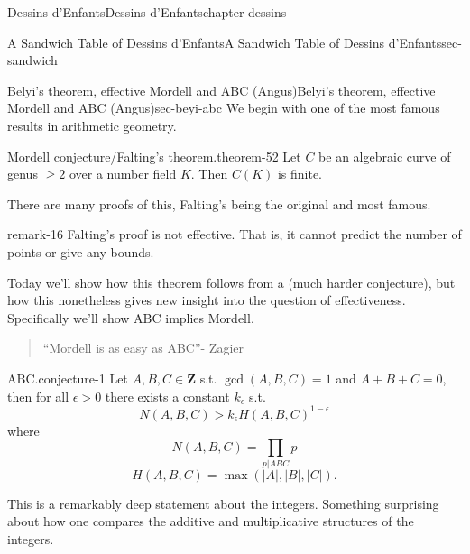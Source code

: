 \documentclass[oneside,10pt,]{book}
\numberwithin{equation}{section}
\newcommand{\ZZ}{\mathbf{Z}}
\newcommand{\gt}{>}
\begin{document}
\begin{chapterptx}{Dessins d'Enfants}{}{Dessins d'Enfants}{}{}{chapter-dessins}
\begin{sectionptx}{A Sandwich Table of Dessins d'Enfants}{}{A Sandwich Table of Dessins d'Enfants}{}{}{sec-sandwich}
\end{sectionptx}
%
%
\typeout{************************************************}
\typeout{************************************************}
%
\begin{sectionptx}{Belyi's theorem, effective Mordell and ABC (Angus)}{}{Belyi's theorem, effective Mordell and ABC (Angus)}{}{}{sec-beyi-abc}
\hypertarget{p-665}{}%
We begin with one of the most famous results in arithmetic geometry.%
\begin{theorem}{Mordell conjecture/Falting's theorem.}{}{theorem-52}%
\hypertarget{p-666}{}%
Let \(C\) be an algebraic curve of \hyperref[def-class-set]{genus} \(\ge 2\) over a number field \(K\). Then \(C(K)\) is finite.%
\end{theorem}
\hypertarget{p-667}{}%
There are many proofs of this, Falting's being the original and most famous.%
\begin{remark}{}{remark-16}%
\hypertarget{p-668}{}%
Falting's proof is not effective. That is, it cannot predict the number of points or give any bounds.%
\end{remark}
\hypertarget{p-669}{}%
Today we'll show how this theorem follows from a (much harder conjecture), but how this nonetheless gives new insight into the question of effectiveness. Specifically we'll show ABC implies Mordell.%
\begin{quote}\hypertarget{blockquote-1}{}
\hypertarget{p-670}{}%
``Mordell is as easy as ABC''- Zagier%
\end{quote}
\begin{conjecture}{ABC.}{}{conjecture-1}%
\hypertarget{p-671}{}%
Let \(A,B,C\in \ZZ\) s.t. \(\gcd(A,B,C)  =1 \) and \(A+B+C=0\), then for all \(\epsilon \gt 0\) there exists a constant \(k_\epsilon\) s.t.%
\begin{equation*}
N(A,B,C) \gt k_\epsilon H(A,B,C)^{1-\epsilon}
\end{equation*}
where%
\begin{equation*}
N(A,B,C) =  \prod_{p|ABC} p
\end{equation*}
%
\begin{equation*}
H(A,B,C) = \max(|A|,|B|,|C|)\text{.}
\end{equation*}
%
\end{conjecture}
\hypertarget{p-672}{}%
This is a remarkably deep statement about the integers. Something surprising about how one compares the additive and multiplicative structures of the integers.%
\par

\end{sectionptx}
\end{chapterptx}
\end{document}
